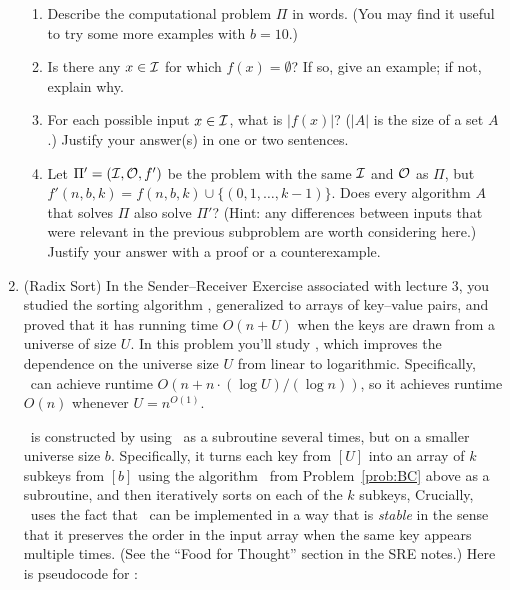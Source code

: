 \documentclass[11pt]{article}
\begin{document}
\begin{enumerate}
\begin{enumerate}
\item Describe the computational problem $\Pi$ in words.  (You may find it useful to try some more examples with $b=10$.) 






\item Is there any $x\in \mathcal{I}$ for which $f(x)=\emptyset$? If so, give an example; if not, explain why.






\item For each possible input $x\in \mathcal{I}$, what is $|f(x)|$? ($|A|$ is the size of a set $A$.) Justify your answer(s) in one or two sentences.






\item Let $\Pi'=(\mathcal{I},\mathcal{O},f')$ be the problem with the same $\mathcal{I}$ and $\mathcal{O}$ as $\Pi$, but $f'(n,b,k) = f(n,b,k) \cup \{(0,1, \ldots,k-1)\}$. Does every algorithm $A$ that solves $\Pi$ also solve $\Pi'$? (Hint: any differences between inputs that were relevant in the previous subproblem are worth considering here.) Justify your answer with a proof or a counterexample.






\end{enumerate}
\newpage

\item (Radix Sort) In the Sender--Receiver Exercise associated with lecture 3, you studied the sorting algorithm \SingletonBucketSort, generalized to arrays of key--value pairs, and proved that it has running time $O(n+U)$ when the keys are drawn from a universe of size $U$. In this problem you'll study {\em \RadixSort}, which improves the dependence on the universe size $U$ from linear to logarithmic.  Specifically, \RadixSort\ can achieve runtime $O(n+n\cdot (\log U)/(\log n))$, so it achieves runtime $O(n)$ whenever $U = n^{O(1)}$.  

\RadixSort\ is constructed by using \SingletonBucketSort\ as a subroutine several times, but on a smaller universe size $b$.  Specifically, it turns each key from $[U]$ into an array of $k$ subkeys from $[b]$ using the algorithm \BC\ from Problem~\ref{prob:BC} above as a subroutine, and then iteratively sorts on each of the $k$ subkeys,
Crucially, \RadixSort\ uses the fact that \SingletonBucketSort\ can be implemented in a way that is {\em stable} in the sense that it preserves the order in the input array when the same key appears multiple times.  (See the ``Food for Thought'' section in the SRE notes.)  Here is pseudocode for \RadixSort:



\end{enumerate}
\end{document}
